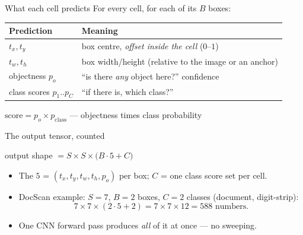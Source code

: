 \documentclass[10pt,aspectratio=169]{beamer}
\begin{document}
\begin{frame}{What each cell predicts}
  For every cell, for each of its $B$ boxes:
  \begin{center}
  \begin{tabular}{@{}ll@{}}
    \toprule
    \textbf{Prediction} & \textbf{Meaning} \\
    \midrule
    $t_x,t_y$ & box centre, \emph{offset inside the cell} ($0$--$1$) \\
    $t_w,t_h$ & box width/height (relative to the image or an anchor) \\
    objectness $p_o$ & ``is there \emph{any} object here?'' confidence \\
    class scores $p_1..p_C$ & ``if there is, which class?'' \\
    \bottomrule
  \end{tabular}
  \end{center}
  \begin{mathbox}
    $\text{score}=p_o\times p_{\text{class}}$ \quad --- objectness times class probability
  \end{mathbox}
\end{frame}

\begin{frame}{The output tensor, counted}
  \begin{mathbox}
    output shape $=S\times S\times\big(B\cdot5 + C\big)$
  \end{mathbox}
  \begin{itemize}
    \item The $5$ = $(t_x,t_y,t_w,t_h,p_o)$ per box; $C$ = one class score set per cell.
    \item DocScan example: $S{=}7$, $B{=}2$ boxes, $C{=}2$ classes (document, digit-strip):
      \[ 7\times7\times(2\cdot5+2)=7\times7\times12 = 588 \text{ numbers.} \]
    \item One CNN forward pass produces \emph{all} of it at once --- no sweeping.
  \end{itemize}
\end{frame}
\end{document}
